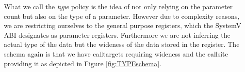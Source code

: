 What we call the \emph{type} policy is the idea of not only relying on the parameter count but also on the type of a parameter. However due to complexity reasons,
we are restricting ourselves to the general purpose registers, which the SystemV ABI designates as parameter registers. Furthermore we are not inferring 
the actual type of the data but the wideness of the data stored in the register. The schema again is that we have calltargets requiring wideness and the
callsite providing it as depicted in Figure \ref{fig:TYPEschema}.
%
%
%
%
%
%
%
